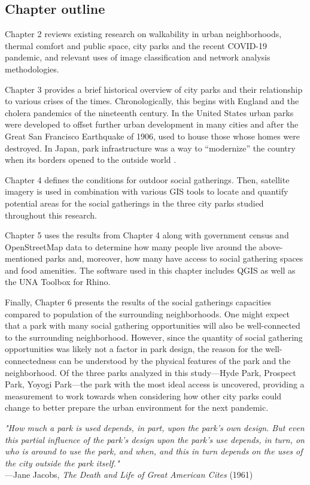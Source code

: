 \begin{multicols}{2}

\section{Chapter outline}
Chapter 2 reviews existing research on walkability in urban neighborhoods, thermal comfort and public space, city parks and the recent COVID-19 pandemic, and relevant uses of image classification and network analysis methodologies.

Chapter 3 provides a brief historical overview of city parks and their relationship to various crises of the times. Chronologically, this begins with England and the cholera pandemics of the nineteenth century. In the United States urban parks were developed to offset further urban development in many cities and after the Great San Francisco Earthquake of 1906, used to house those whose homes were destroyed. In Japan, park infrastructure was a way to “modernize” the country when its borders opened to the outside world \cite{havens_parkscapes_2011}. 

Chapter 4 defines the conditions for outdoor social gatherings. Then, satellite imagery is used in combination with various GIS tools to locate and quantify potential areas for the social gatherings in the three city parks studied throughout this research.

Chapter 5 uses the results from Chapter 4 along with government census and OpenStreetMap data to determine how many people live around the above-mentioned parks and, moreover, how many have access to social gathering spaces and food amenities. The software used in this chapter includes QGIS as well as the UNA Toolbox for Rhino. 

Finally, Chapter 6 presents the results of the social gatherings capacities compared to population of the surrounding neighborhoods. One might expect that a park with many social gathering opportunities will also be well-connected to the surrounding neighborhood. However, since the quantity of social gathering opportunities was likely not a factor in park design, the reason for the well-connectedness can be understood by the physical features of the park and the neighborhood. Of the three parks analyzed in this study---Hyde Park, Prospect Park, Yoyogi Park---the park with the most ideal access is uncovered, providing a measurement to work towards when considering how other city parks could change to better prepare the urban environment for the next pandemic.

\end{multicols}

\textit{"How much a park is used depends, in part, upon the park's own design. But even this partial influence of the park's design upon the park's use depends, in turn, on who is around to use the park, and when, and this in turn depends on the uses of the city outside the park itself."}\\
---Jane Jacobs, \textit{The Death and Life of Great American Cites} (1961)